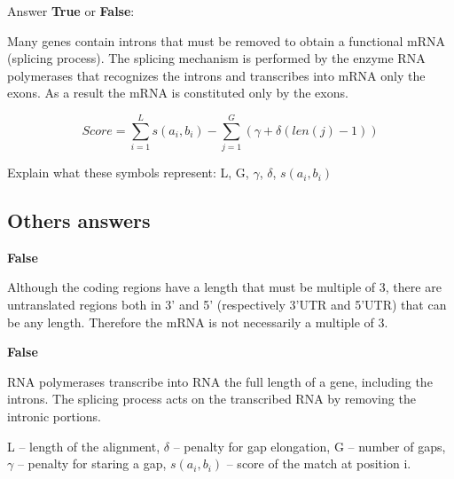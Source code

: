 \begin{Exercise} [
  title={Splicing},
  difficulty={1},
  label={ex21},
  origin={G. Valle}
 ]

Answer \textbf{True} or \textbf{False}:

  \Question Many genes contain introns that must be removed to obtain a
functional mRNA (splicing process).
The splicing mechanism is performed by the enzyme RNA polymerases that
recognizes the introns and transcribes into mRNA only the exons.
As a result the mRNA is constituted only by the exons.

\end{Exercise}

\begin{Exercise} [
  title={Objective function for alignment},
  difficulty={1},
  label={ex22},
  origin={G. Valle}
 ]

\begin{equation}
Score = \sum_{i=1}^{L} s(a_i,b_i) - \sum_{j=1}^{G} (\gamma + \delta(len(j)-1))
\end{equation}

  \Question Explain what these symbols represent: L, G, $\gamma$, $\delta$,
$s(a_i,b_i)$

\end{Exercise}

\subsection{Others answers}

\begin{Answer} [
   ref={ex20},
   number={20}
 ]

  \Question \textbf{False}

Although the coding regions have a length that must be multiple of 3, there are untranslated regions both in 3' and 5' (respectively 3'UTR and 5'UTR) that can be any length. Therefore the mRNA is not necessarily a multiple of 3.

\end{Answer}

\begin{Answer} [
   ref={ex21},
   number={21}
 ]

  \Question \textbf{False}

RNA polymerases transcribe into RNA the full length of a gene, including the introns. The splicing process acts on the transcribed RNA by removing the intronic portions.

\end{Answer}

\begin{Answer} [
   ref={ex22},
   number={22}
 ]

  \Question L – length of the alignment, $\delta$ – penalty for gap elongation,
G – number of gaps, $\gamma$ – penalty for staring a gap, $s(a_i, b_i)$ –
score of the match at position i.

\end{Answer}
